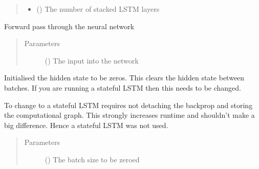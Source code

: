 \documentclass[letterpaper,10pt,english]{sphinxmanual}
\begin{document}
\begin{fulllineitems}
\begin{quote}
\begin{description}
\begin{itemize}
\item {} 
 () \textendash{} The number of stacked LSTM layers

\end{itemize}

\end{description}\end{quote}

\begin{fulllineitems}
\label{\detokenize{models:Foresight.models.LSTM_shallow.forward}}
Forward pass through the neural network
\begin{quote}\begin{description}
\item[{Parameters}] \leavevmode
{} () \textendash{} The input into the network

\end{description}\end{quote}

\end{fulllineitems}


\begin{fulllineitems}
\label{\detokenize{models:Foresight.models.LSTM_shallow.init_hidden}}
Initialised the hidden state to be zeros. This clears the hidden
state between batches. If you are running a stateful LSTM then this
needs to be changed.

To change to a stateful LSTM requires not detaching the backprop and
storing the computational graph. This strongly increases runtime and
shouldn’t make a big difference. Hence a stateful LSTM was not used.
\begin{quote}\begin{description}
\item[{Parameters}] \leavevmode
{} () \textendash{} The batch size to be zeroed

\end{description}\end{quote}

\end{fulllineitems}


\end{fulllineitems}
\end{document}
